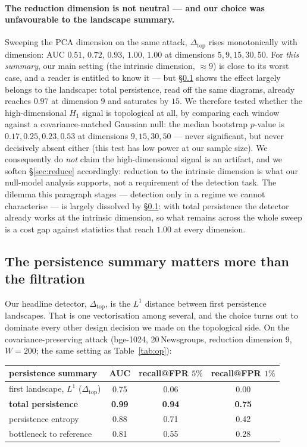 \documentclass[11pt]{article}
\theoremstyle{remark}
\begin{document}
\paragraph{The reduction dimension is not neutral --- and our choice was unfavourable to the
landscape summary.}
Sweeping the PCA dimension on the same attack, $\Delta_{\mathrm{top}}$ rises monotonically with
dimension: AUC $0.51,\,0.72,\,0.93,\,1.00,\,1.00$ at dimensions $5,9,15,30,50$. For \emph{this summary}, our main setting (the intrinsic dimension,
$\approx9$) is close to its worst case, and a reader is entitled to know it --- but
\S\ref{sec:summary} shows the effect largely belongs to the landscape: total persistence, read off
the same diagrams, already reaches $0.97$ at dimension $9$ and saturates by $15$. We therefore tested whether the high-dimensional $H_1$ signal is topological at all, by comparing
each window against a covariance-matched Gaussian null: the median bootstrap $p$-value is
$0.17,0.25,0.23,0.53$ at dimensions $9,15,30,50$ --- never significant, but never decisively
absent either (this test has low power at our sample size). We consequently do \emph{not} claim
the high-dimensional signal is an artifact, and we soften \S\ref{sec:reduce} accordingly: reduction
to the intrinsic dimension is what our null-model analysis supports, not a requirement of the
detection task. The dilemma this paragraph stages --- detection only in a regime we cannot
characterise --- is largely dissolved by \S\ref{sec:summary}: with total persistence the detector
already works at the intrinsic dimension, so what remains across the whole sweep is a cost gap
against statistics that reach $1.00$ at every dimension.



\subsection{The persistence summary matters more than the filtration}\label{sec:summary}
Our headline detector, $\Delta_{\mathrm{top}}$, is the $L^1$ distance between first persistence
landscapes. That is one vectorisation among several, and the choice turns out to dominate every
other design decision we made on the topological side. On the covariance-preserving attack (bge-1024, 20\,Newsgroups, reduction dimension $9$,
$W=200$; the same setting as Table~\ref{tab:op}):

\begin{center}
\begin{tabular}{lccc}
\toprule
persistence summary & AUC & recall@FPR $5\%$ & recall@FPR $1\%$\\
\midrule
first landscape, $L^1$ ($\Delta_{\mathrm{top}}$) & 0.75 & 0.06 & 0.00\\
\textbf{total persistence} & \textbf{0.99} & \textbf{0.94} & \textbf{0.75}\\
persistence entropy & 0.88 & 0.71 & 0.42\\
bottleneck to reference & 0.81 & 0.55 & 0.28\\
\bottomrule
\end{tabular}
\end{center}
\end{document}

